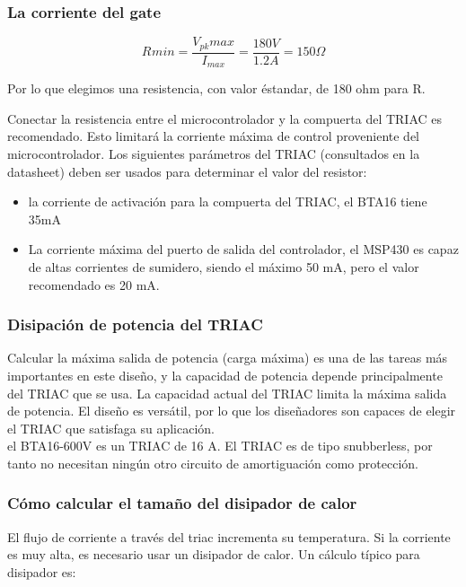     \subsubsection*{La corriente del gate}
        \begin{equation}
            R_{ }min   
            =   \frac { V_{pk}max } { I_{max} }    
            =   \frac { 180V } { 1.2A } = 150\Omega
        \end{equation}
        
        Por lo que elegimos una resistencia, con valor éstandar, de 180 ohm para R.
        
        Conectar la resistencia entre el microcontrolador y la compuerta del TRIAC es recomendado. Esto limitará la corriente máxima de control proveniente del microcontrolador. Los siguientes parámetros del TRIAC (consultados en la datasheet) deben ser usados para determinar el valor del resistor:\\

        \begin{itemize}
            \item {
                \setlength{\parskip}{-1mm}
                la corriente de activación para la compuerta del TRIAC, el BTA16 tiene 35mA
                }
            \item {
                \setlength{\parskip}{-1mm}
                La corriente máxima del puerto de salida del controlador, el MSP430 es capaz de altas corrientes de sumidero, siendo el máximo 50 mA, pero el valor recomendado es 20 mA.
                }
        \end{itemize}
        
    \subsubsection*{Disipación de potencia del TRIAC}
    Calcular la máxima salida de potencia (carga máxima) es una de las tareas más importantes en este diseño, y la capacidad de potencia depende principalmente del TRIAC que se usa. La capacidad actual del TRIAC limita la máxima salida de potencia. El diseño es versátil, por lo que los diseñadores son capaces de elegir el TRIAC que satisfaga su aplicación.\\
    
    el BTA16-600V es un TRIAC de 16 A. El TRIAC es de tipo snubberless, por tanto no necesitan ningún otro circuito de amortiguación como protección. 
    
        \subsubsection*{Cómo calcular el tamaño del disipador de calor}
            El flujo de corriente a través del triac incrementa su temperatura. Si la corriente es muy alta, es necesario usar un disipador de calor. Un cálculo típico para disipador es:\\
            
